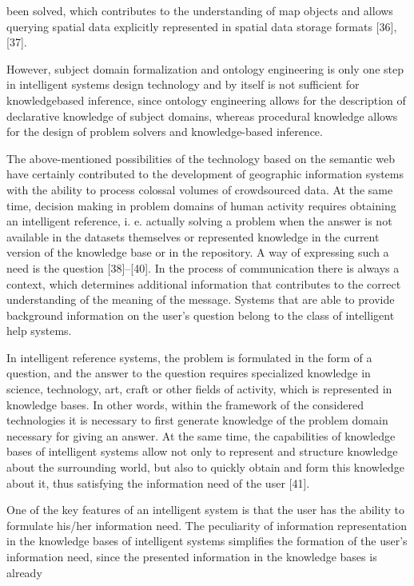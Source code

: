 \documentclass[a4paper]{article}
\begin{document}
\begin{multicols}{2}
{{been solved, which contributes to the understanding of
map objects and allows querying spatial data explicitly
represented in spatial data storage formats [36], [37].\par
However, subject domain formalization and ontology
engineering is only one step in intelligent systems design
technology and by itself is not sufficient for knowledgebased inference, since ontology engineering allows for
the description of declarative knowledge of subject domains, whereas procedural knowledge allows for the design of problem solvers and knowledge-based inference.\par
The above-mentioned possibilities of the technology
based on the semantic web have certainly contributed to
the development of geographic information systems with
the ability to process colossal volumes of crowdsourced
data. At the same time, decision making in problem
domains of human activity requires obtaining an intelligent reference, i. e. actually solving a problem when
the answer is not available in the datasets themselves
or represented knowledge in the current version of the
knowledge base or in the repository. A way of expressing
such a need is the question [38]–[40]. In the process
of communication there is always a context, which determines additional information that contributes to the
correct understanding of the meaning of the message.
Systems that are able to provide background information
on the user’s question belong to the class of intelligent
help systems.\par
In intelligent reference systems, the problem is formulated in the form of a question, and the answer to
the question requires specialized knowledge in science,
technology, art, craft or other fields of activity, which is
represented in knowledge bases. In other words, within
the framework of the considered technologies it is necessary to first generate knowledge of the problem domain
necessary for giving an answer. At the same time, the
capabilities of knowledge bases of intelligent systems
allow not only to represent and structure knowledge
about the surrounding world, but also to quickly obtain
and form this knowledge about it, thus satisfying the
information need of the user [41].\par
One of the key features of an intelligent system is that
the user has the ability to formulate his/her information
need. The peculiarity of information representation in
the knowledge bases of intelligent systems simplifies
the formation of the user’s information need, since the
presented information in the knowledge bases is already
}}
\end{multicols}
\end{document}
